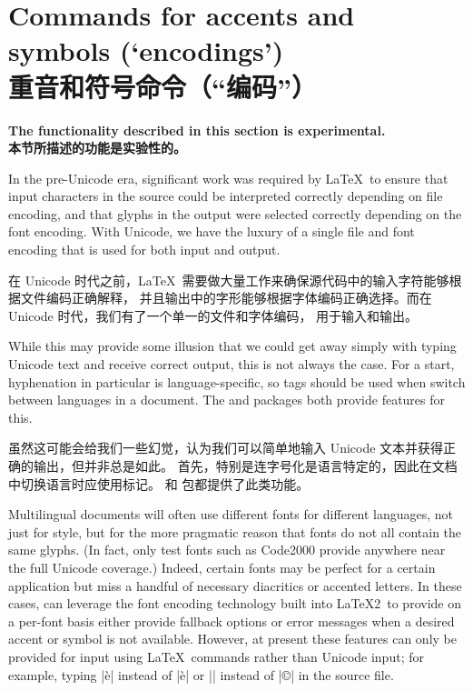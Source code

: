 \documentclass[a4paper]{l3doc}
\begin{document}
\part{Commands for accents and symbols (`encodings')\\重音和符号命令（“编码”）}
\label{part:enc}

\textbf{The functionality described in this section is experimental.\\本节所描述的功能是实验性的。}

In the pre-Unicode era, significant work was required by \LaTeX\ to ensure that
input characters in the source could be interpreted correctly depending on file encoding,
and that glyphs in the output were selected correctly depending on the font encoding.
With Unicode, we have the luxury of a single file and font encoding that is used for both input
and output.

在 Unicode 时代之前，\LaTeX\ 需要做大量工作来确保源代码中的输入字符能够根据文件编码正确解释，
并且输出中的字形能够根据字体编码正确选择。而在 Unicode 时代，我们有了一个单一的文件和字体编码，
用于输入和输出。

While this may provide some illusion that we could get away simply with typing
Unicode text and receive correct output, this is not always the case.
For a start, hyphenation in particular is language-specific, so tags should be used
when switch between languages in a document.
The  and  packages both provide features for this.

虽然这可能会给我们一些幻觉，认为我们可以简单地输入 Unicode 文本并获得正确的输出，但并非总是如此。
首先，特别是连字号化是语言特定的，因此在文档中切换语言时应使用标记。 和  包都提供了此类功能。

Multilingual documents will often use different fonts for different languages,
not just for style, but for the more pragmatic reason that fonts do not all contain
the same glyphs. (In fact, only test fonts such as Code2000 provide
anywhere near the full Unicode coverage.)
Indeed, certain fonts may be perfect for a certain application but miss a handful
of necessary diacritics or accented letters.
In these cases,  can leverage the font encoding technology built
into \LaTeX2\ to provide on a per-font basis either provide fallback options or
error messages when a desired accent or symbol is not available.
However, at present
these features can only be provided for input using \LaTeX\ commands rather
than Unicode input; for example, typing |\`e| instead of |è| or |\textcopyright|
instead of |©| in the source file.
\end{document}
